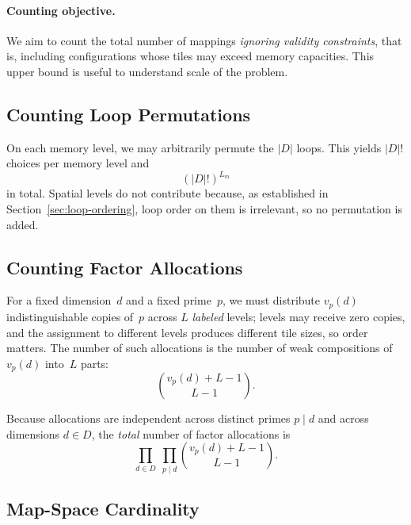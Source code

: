 \paragraph{Counting objective.}
We aim to count the total number of mappings \emph{ignoring validity
constraints}, that is, including configurations whose tiles may
exceed memory capacities.
This upper bound is useful to understand scale of the problem.


\subsection{Counting Loop Permutations}
\label{sec:count-permutations}

On each memory level, we may arbitrarily permute the $|D|$ loops.
This yields $|D|!$ choices per memory level and
\[
  (|D|!)^{L_m}
\]
in total.
Spatial levels do not contribute because, as established in
Section~\ref{sec:loop-ordering}, loop order on them is irrelevant, so no permutation is added.


\subsection{Counting Factor Allocations}
\label{sec:count-factors}

For a fixed dimension~$d$ and a fixed prime~$p$, we must distribute
$v_p(d)$ indistinguishable copies of~$p$ across $L$ \emph{labeled}
levels; levels may receive zero copies, and the assignment to
different levels produces different tile sizes, so order matters.
The number of such allocations is the number of weak compositions
of~$v_p(d)$ into~$L$ parts:
\[
  \binom{v_p(d) + L - 1}{L - 1}.
\]

Because allocations are independent across distinct primes $p \mid d$
and across dimensions $d \in D$, the \emph{total} number of factor
allocations is
\[
  \prod_{d \in D}\;\prod_{p \mid d}
    \binom{v_p(d) + L - 1}{L - 1}.
\]


\subsection{Map-Space Cardinality}
\label{sec:mapspace-card}

